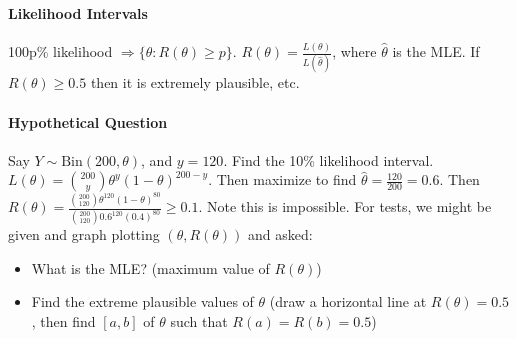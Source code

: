 \documentclass[10pt,letter]{article}
\theoremstyle{plain}
\theoremstyle{definition}
\begin{document}
\paragraph{Likelihood Intervals}
100p\% likelihood $\Rightarrow\{\theta:R(\theta)\geq p\}$. $R(\theta)=\frac{L(\theta)}{L(\hat{\theta})}$, where $\hat{\theta}$ is the MLE. If $R(\theta)\geq0.5$ then it is extremely plausible, etc. 
\paragraph{Hypothetical Question}
Say $Y\sim\text{Bin}(200,\theta)$, and $y=120$. Find the 10\% likelihood interval. $L(\theta)=\binom{200}{ y}\theta^y(1-\theta)^{200-y}$. Then maximize to find $\hat{\theta}=\frac{120}{200}=0.6$. Then $R(\theta)=\frac{\binom{200}{120}\theta^{120}(1-\theta)^{80}}{\binom{200}{120}0.6^{120}(0.4)^{80}}\geq0.1$. Note this is impossible. For tests, we might be given and graph plotting $(\theta,R(\theta))$ and asked: 
\begin{itemize}
    \item What is the MLE? (maximum value of $R(\theta)$) 
    \item Find the extreme plausible values of $\theta$ (draw a horizontal line at $R(\theta)=0.5$, then find $[a,b]$ of $\theta$ such that $R(a)=R(b)=0.5$)
\end{itemize}
\end{document}
